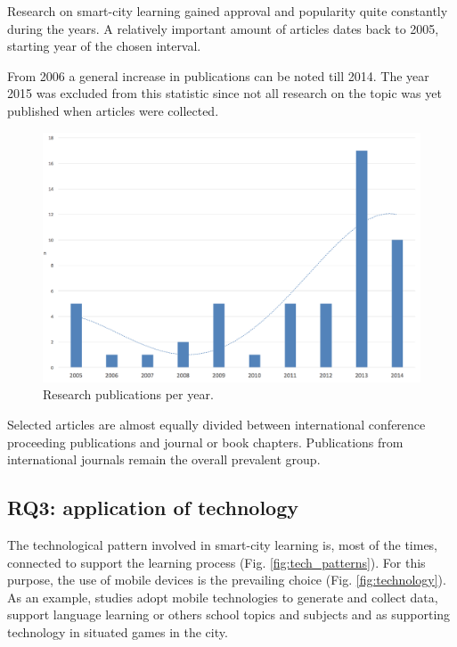 Research on smart-city learning gained approval and popularity quite constantly during the years. A relatively important amount of articles dates back to 2005, starting year of the chosen interval.

From 2006 a general increase in publications can be noted till 2014. The year 2015 was excluded from this statistic since not all research on the topic was yet published when articles were collected.

\begin{figure}[htb]
\centering
\includegraphics[width=12cm]{img/years}
\caption{Research publications per year.}
\label{fig:years}
\end{figure}

Selected articles are almost equally divided between international conference proceeding publications and journal or book chapters.
Publications from international journals remain the overall prevalent group.



\subsection*{RQ3: application of technology}

The technological pattern involved in smart-city learning is, most of the times, connected to support the learning process (Fig. \ref{fig:tech_patterns}).
For this purpose, the use of mobile devices is the prevailing choice (Fig. \ref{fig:technology}).
As an example, studies adopt mobile technologies to generate and collect data\cite{philip_framework_2013}\cite{akkerman_storification_2009-1}, support language learning or others school topics and subjects\cite{gaved_challenges_2014} and as supporting technology in situated games in the city\cite{akkerman_storification_2009-1}\cite{huizenga_cognitive_2008}.


